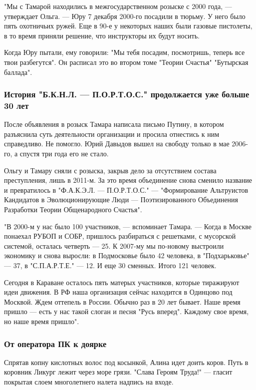 "Мы с Тамарой находились в межгосударственном розыске с 2000 года, --- утверждает
Ольга. --- Юру 7 декабря 2000-го посадили в тюрьму. У него было пять охотничьих
ружей. Еще в 90-е у некоторых наших были газовые пистолеты, в то время приняли
решение, что инструкторы их будут носить.

Когда Юру пытали, ему говорили: "Мы тебя посадим, посмотришь, теперь все твои
разбегутся". Он расписал это во втором томе "Теории Счастья" "Бутырская
баллада".

\subsubsection{История "Б.К.Н.Л. --- П.О.Р.Т.О.С." продолжается уже больше 30 лет}

После объявления в розыск Тамара написала письмо Путину, в котором разъяснила
суть деятельности организации и просила отнестись к ним справедливо. Не
помогло. Юрий Давыдов вышел на свободу только в мае 2006-го, а спустя три года
его не стало. 

Ольгу и Тамару сняли с розыска, закрыв дело за отсутствием состава
преступления, лишь в 2011-м. За это время объединение снова сменило название и
превратилось в "Ф.А.К.Э.Л. --- П.О.Р.Т.О.С." --- "Формирование Альтруистов
Кандидатов в Эволюционирующие Люди --- Поэтизированного Объединения Разработки
Теории Общенародного Счастья".

"В 2000-м у нас было 100 участников, --- вспоминает Тамара. --- Когда в Москве
понаехал РУБОП и СОБР, пришлось разбираться с решетками, с мусорской системой,
осталась четверть --- 25. К 2007-му мы по-новому выстроили экономику и снова
выросли: в Подмосковье было 42 человека, в "Подхарьковье" --- 37, в
"С.П.А.Р.Т.Е." --- 12. И еще 30 сменных. Итого 121 человек. 

Сегодня в Караване осталось пять матерых участников, которые тиражируют идеи
движения. В РФ наша организация сейчас находится в Одинцово под Москвой. Ждем
оттепель в России. Обычно раз в 20 лет бывает. Наше время пришло --- есть у нас
такой слоган и песня "Русь вперед". Каждому свое время, но наше время пришло".

\subsubsection{От оператора ПК к доярке}

Спрятав копну кислотных волос под косынкой, Алина идет доить коров. Путь в
коровник Ликург лежит через море грязи. "Слава Героям Труда!" --- гласит покрытая
слоем многолетнего налета надпись на входе.

